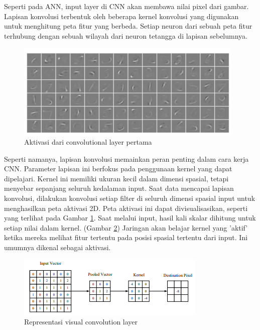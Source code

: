 Seperti pada ANN, input layer di CNN akan membawa nilai pixel dari gambar\parencite{Keiron2015}. Lapisan konvolusi terbentuk oleh beberapa kernel konvolusi yang digunakan untuk menghitung peta fitur yang berbeda. Setiap neuron dari sebuah peta fitur terhubung dengan sebuah wilayah dari neuron tetangga di lapisan sebelumnya\parencite{Jiuxiang2018}.

\begin{figure} [H] \centering
  \includegraphics[scale=1]{gambar/bab2/cnn2.png}
  \caption{Aktivasi dari convolutional layer pertama \parencite{Keiron2015}}
  \label{fig:CNNConvo}
\end{figure}

Seperti namanya, lapisan konvolusi memainkan peran penting dalam cara kerja CNN. Parameter lapisan ini berfokus pada penggunaan kernel yang dapat dipelajari. Kernel ini memiliki ukuran kecil dalam dimensi spasial, tetapi menyebar sepanjang seluruh kedalaman input. Saat data mencapai lapisan konvolusi, dilakukan konvolusi setiap filter di seluruh dimensi spasial input untuk menghasilkan peta aktivasi 2D. Peta aktivasi ini dapat divisualisasikan, seperti yang terlihat pada Gambar \ref{fig:CNNConvo}. Saat melalui input, hasil kali skalar dihitung untuk setiap nilai dalam kernel. (Gambar \ref{fig:Blueprint}) Jaringan akan belajar kernel yang 'aktif' ketika mereka melihat fitur tertentu pada posisi spasial tertentu dari input. Ini umumnya dikenal sebagai aktivasi\parencite{Keiron2015}.

\begin{figure} [H] \centering
  \includegraphics[scale=1]{gambar/bab2/cnn3.png}
  \caption{Representasi visual convolution layer \parencite{Keiron2015}}
  \label{fig:Blueprint}
\end{figure}

